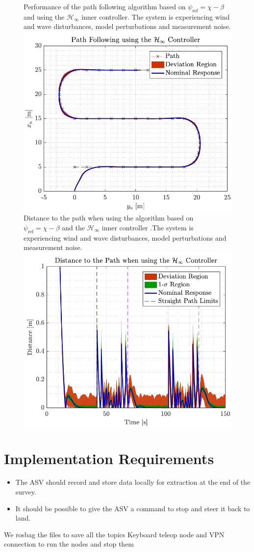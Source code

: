 \begin{figure}[H]
    \captionbox 
    {   
        Performance of the path following algorithm based on $\psi_\mathrm{ref}=\chi-\beta$ and using the $\mathcal{H}_\infty$ inner controller. The system is experiencing wind and wave disturbances, model perturbations and measurement noise. \label{fig:path_rob2}
    }                                                                 
    {                                                                  
        \includegraphics[width=.45\textwidth]{figures/path_rob}         
    }                                                                    
    \hspace{5pt}                                                          
    \captionbox  
    {      
        Distance to the path when using the algorithm based on $\psi_\mathrm{ref}=\chi-\beta$ and the $\mathcal{H}_\infty$ inner controller .The system is experiencing wind and wave disturbances, model perturbations and measurement noise.\label{fig:dist_rob2}
    }                                                                          
    {
        \includegraphics[width=.45\textwidth]{figures/dist_rob}
    }
\end{figure}



\section{Implementation Requirements}
\begin{itemize}
    \item The ASV should record and store data locally for extraction at the end of the survey.
    \item It should be possible to give the ASV a command to stop and steer it back to land.
\end{itemize}

We rosbag the files to save all the topics
Keyboard teleop node and VPN connection to run the nodes and stop them